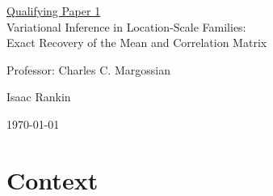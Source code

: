 \documentclass{article}
\begin{document}
\begin{center}
    \huge{\underline{Qualifying Paper 1} \\
        \vspace{5pt}
        Variational Inference in Location-Scale Families: \\
        \vspace{5pt}
        Exact Recovery of the Mean and Correlation Matrix}

    \vspace{1cm}

    \Large{Professor: Charles C. Margossian}

    \vspace{1cm}

    \Large{Isaac Rankin}

    \vspace{1cm}

    \large \today
\end{center}

\newpage



\tableofcontents
\newpage








\section{Context}
\end{document}
